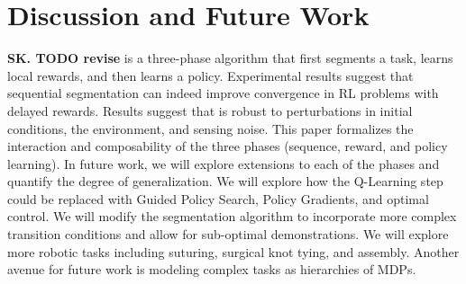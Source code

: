 \section{Discussion and Future Work}
\textbf{SK. TODO revise}
\hirl is a three-phase algorithm that first segments a task, learns local rewards, and then learns a policy.
Experimental results suggest that sequential segmentation can indeed improve convergence in RL problems with delayed rewards.
Results suggest that \hirl is robust to perturbations in initial conditions, the environment, and sensing noise.
This paper formalizes the interaction and composability of the three phases (sequence, reward, and policy learning). In future work, we will explore extensions to each of the phases and quantify the degree of generalization.
We will explore how the Q-Learning step could be replaced with Guided Policy Search, Policy Gradients, and optimal control.
We will modify the segmentation algorithm to incorporate more complex transition conditions and allow for sub-optimal demonstrations.
We will explore more robotic tasks including suturing, surgical knot tying, and assembly.
Another avenue for future work is modeling complex tasks as hierarchies of MDPs.

